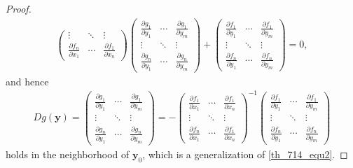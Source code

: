 \documentclass[10pt]{book}
\theoremstyle{definition}
\numberwithin{equation}{chapter}
\begin{document}
\begin{proof}
\begin{align*}
\begin{pmatrix}
        \vdots & \ddots & \vdots \\
        \frac{\partial f_n}{\partial x_1} & \cdots & \frac{\partial f_1}{\partial x_n}
    \end{pmatrix} 
    \begin{pmatrix}
        \frac{\partial g_1}{\partial y_1} & \cdots & \frac{\partial g_1}{\partial y_m} \\
        \vdots & \ddots & \vdots \\
        \frac{\partial g_n}{\partial y_1} & \cdots & \frac{\partial g_n}{\partial y_m}
    \end{pmatrix} + 
    \begin{pmatrix}
        \frac{\partial f_1}{\partial y_1} & \cdots & \frac{\partial f_1}{\partial y_m} \\
        \vdots & \ddots & \vdots \\
        \frac{\partial f_n}{\partial y_1} & \cdots & \frac{\partial f_n}{\partial y_m}
    \end{pmatrix} = 0,
\end{align*}
and hence
\begin{align*}
    Dg(\mathbf{y}) = \begin{pmatrix}
        \frac{\partial g_1}{\partial y_1} & \cdots & \frac{\partial g_1}{\partial y_m} \\
        \vdots & \ddots & \vdots \\
        \frac{\partial g_n}{\partial y_1} & \cdots & \frac{\partial g_n}{\partial y_m}
    \end{pmatrix} = - \begin{pmatrix}
        \frac{\partial f_1}{\partial x_1} & \cdots & \frac{\partial f_1}{\partial x_n} \\
        \vdots & \ddots & \vdots \\
        \frac{\partial f_n}{\partial x_1} & \cdots & \frac{\partial f_1}{\partial x_n}
    \end{pmatrix}^{-1} \begin{pmatrix}
        \frac{\partial f_1}{\partial y_1} & \cdots & \frac{\partial f_1}{\partial y_m} \\
        \vdots & \ddots & \vdots \\
        \frac{\partial f_n}{\partial y_1} & \cdots & \frac{\partial f_n}{\partial y_m}
    \end{pmatrix}
\end{align*}
holds in the neighborhood of $\mathbf{y}_0$, which is a generalization of \eqref{th_714_equ2}.
\end{proof}
\end{document}
